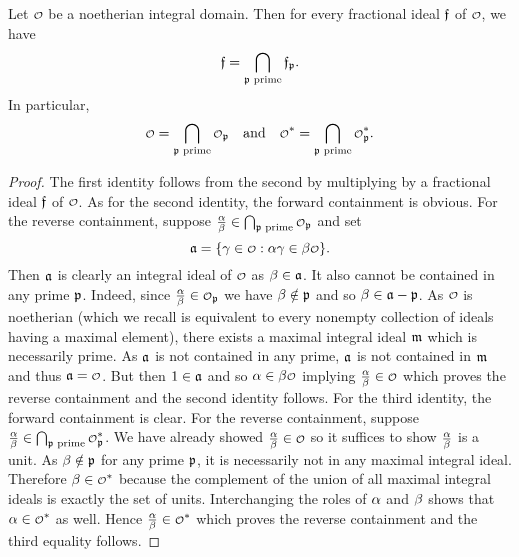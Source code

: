     \begin{proposition}\label{prop:ring_is_intersection_of_all_localizations}
      Let $\smc{O}$ be a noetherian integral domain. Then for every fractional ideal $\mathfrak{f}$ of $\smc{O}$, we have
      \[
        \mathfrak{f} = \bigcap_{\text{$\mathfrak{p}$ prime}}\mathfrak{f}_{\mathfrak{p}}.
      \]
      In particular,
      \[
        \smc{O} = \bigcap_{\text{$\mf{p}$ prime}}\smc{O}_{\mf{p}} \quad \text{and} \quad \smc{O}^{\ast} = \bigcap_{\text{$\mf{p}$ prime}}\smc{O}_{\mf{p}}^{\ast}.
      \]
    \end{proposition}
    \begin{proof}
      The first identity follows from the second by multiplying by a fractional ideal $\mathfrak{f}$ of $\smc{O}$. As for the second identity, the forward containment is obvious. For the reverse containment, suppose $\frac{\a}{\b} \in \bigcap_{\text{$\mf{p}$ prime}}\smc{O}_{\mf{p}}$ and set
      \[
        \mf{a} = \{\g \in \smc{O}:\a\g \in \b\smc{O}\}.
      \]
      Then $\mathfrak{a}$ is clearly an integral ideal of $\smc{O}$ as $\beta \in \mathfrak{a}$. It also cannot be contained in any prime $\mathfrak{p}$. Indeed, since $\frac{\a}{\b} \in \smc{O}_{\mf{p}}$ we have $\beta \notin \mathfrak{p}$ and so $\beta \in \mathfrak{a}-\mathfrak{p}$. As $\smc{O}$ is noetherian (which we recall is equivalent to every nonempty collection of ideals having a maximal element), there exists a maximal integral ideal $\mathfrak{m}$ which is necessarily prime. As $\mathfrak{a}$ is not contained in any prime, $\mathfrak{a}$ is not contained in $\mathfrak{m}$ and thus $\mf{a} = \smc{O}$. But then $1 \in \mathfrak{a}$ and so $\a \in \b\smc{O}$ implying $\frac{\a}{\b} \in \smc{O}$ which proves the reverse containment and the second identity follows. For the third identity, the forward containment is clear. For the reverse containment, suppose $\frac{\a}{\b} \in \bigcap_{\text{$\mf{p}$ prime}}\smc{O}_{\mf{p}}^{\ast}$. We have already showed $\frac{\a}{\b} \in \smc{O}$ so it suffices to show $\frac{\alpha}{\beta}$ is a unit. As $\beta \notin \mathfrak{p}$ for any prime $\mathfrak{p}$, it is necessarily not in any maximal integral ideal. Therefore $\b \in \smc{O}^{\ast}$ because the complement of the union of all maximal integral ideals is exactly the set of units. Interchanging the roles of $\alpha$ and $\beta$ shows that $\a \in \smc{O}^{\ast}$ as well. Hence $\frac{\a}{\b} \in \smc{O}^{\ast}$ which proves the reverse containment and the third equality follows.
    \end{proof}

